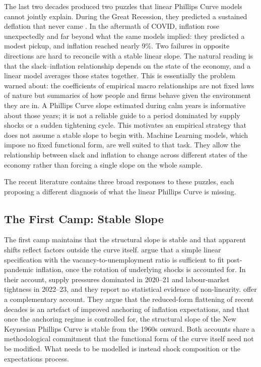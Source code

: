 \documentclass[12pt,a4paper]{article}
\begin{document}
The last two decades produced two puzzles that linear Phillips Curve models cannot jointly explain. During the Great Recession, they predicted a sustained deflation that never came \citep{ball2011,coibion2015}. In the aftermath of COVID, inflation rose unexpectedly and far beyond what the same models implied: they predicted a modest pickup, and inflation reached nearly 9\%. Two failures in opposite directions are hard to reconcile with a stable linear slope. The natural reading is that the slack--inflation relationship depends on the state of the economy, and a linear model averages those states together. This is essentially the problem \citet{lucas1976} warned about: the coefficients of empirical macro relationships are not fixed laws of nature but summaries of how people and firms behave given the environment they are in. A Phillips Curve slope estimated during calm years is informative about those years; it is not a reliable guide to a period dominated by supply shocks or a sudden tightening cycle. This motivates an empirical strategy that does not assume a stable slope to begin with. Machine Learning models, which impose no fixed functional form, are well suited to that task. They allow the relationship between slack and inflation to change across different states of the economy rather than forcing a single slope on the whole sample.

The recent literature contains three broad responses to these puzzles, each proposing a different diagnosis of what the linear Phillips Curve is missing.

\subsection{The First Camp: Stable Slope}
\label{subsec:camp1}

The first camp maintains that the structural slope is stable and that apparent shifts reflect factors outside the curve itself. \citet{bernanke2023} argue that a simple linear specification with the vacancy-to-unemployment ratio is sufficient to fit post-pandemic inflation, once the rotation of underlying shocks is accounted for. In their account, supply pressures dominated in 2020--21 and labour-market tightness in 2022--23, and they report no statistical evidence of non-linearity. \citet{jorgensen2025} offer a complementary account. They argue that the reduced-form flattening of recent decades is an artefact of improved anchoring of inflation expectations, and that once the anchoring regime is controlled for, the structural slope of the New Keynesian Phillips Curve is stable from the 1960s onward. Both accounts share a methodological commitment that the functional form of the curve itself need not be modified. What needs to be modelled is instead shock composition or the expectations process.
\end{document}
